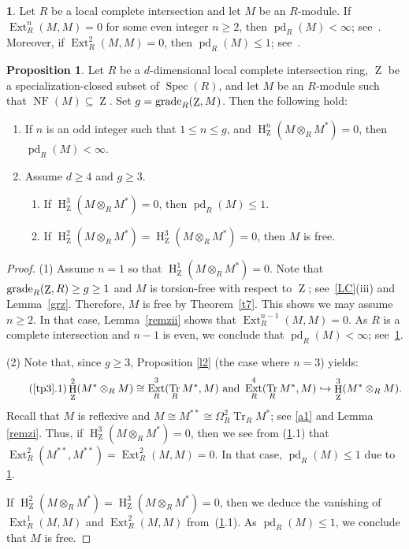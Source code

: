 \documentclass[11pt]{amsart}
\theoremstyle{definition}
\newtheorem{prop}[thm]{Proposition}
\theoremstyle{definition}
\newtheorem{chunk}[thm]{\hspace*{-1.065ex}\bf}
\numberwithin{equation}{section}
\DeclareMathOperator{\gr}{\textnormal{grade}}
\DeclareMathOperator{\Tr}{Tr}
\DeclareMathOperator{\mz}{Z}
\DeclareMathOperator{\Ext}{Ext}
\DeclareMathOperator{\hh}{H}
\DeclareMathOperator{\pd}{pd}
\DeclareMathOperator{\Spec}{Spec}
\DeclareMathOperator{\NF}{NF}
\begin{document}
\begin{chunk} \label{JorJot} Let $R$ be a local complete intersection and let $M$ be an $R$-module. If $\Ext^n_R(M,M)=0$ for some even integer $n\geq 2$, then $\pd_R(M)<\infty$; see~\cite[4.2]{AvBu}. Moreover, if $\Ext^2_R(M,M)=0$, then $\pd_R(M)\leq 1$; see~\cite[2.5]{JorExt}.
\end{chunk}

\begin{prop}\label{tp3} Let $R$ be a $d$-dimensional local complete intersection ring, $\mz$ be a specialization-closed subset of $\Spec(R)$, and let $M$ be an $R$-module such that $\NF(M)\subseteq\mz$. Set $g=\gr_R(\mz,M)$. Then the following hold:
\begin{enumerate}[\rm(1)]
\item If $n$ is an odd integer such that $1\leq n\leq g$, and $\hh^{n}_{\mz}(M\otimes_RM^*)=0$, then $\pd_R(M)<\infty$. 
\item Assume $d\geq 4$ and $g\geq3$. 
\begin{enumerate}[\rm(i)]
\item If $\hh^3_{\mz}(M\otimes_RM^*)=0$, then $\pd_R(M)\leq1$. 
\item If $\hh^2_{\mz}(M\otimes_RM^*)=\hh^3_{\mz}(M\otimes_RM^*)=0$, then $M$ is free.
\end{enumerate}
\end{enumerate}
\end{prop}

\begin{proof} (1) Assume $n=1$ so that $\hh^{1}_{\mz}(M\otimes_RM^*)=0$. Note that $\gr_R(\mz,R)\geq g \geq 1$ and $M$ is torsion-free with respect to $\mz$; see~\ref{LC}(iii) and Lemma~\ref{grz}. Therefore, $M$ is free by Theorem~\ref{t7}. This shows we may assume $n\geq 2$. In that case, Lemma~\ref{remzii} shows that $\Ext^{n-1}_R(M,M)=0$. As $R$ is a complete intersection and $n-1$ is even, we conclude that $\pd_R(M)<\infty$; see~\ref{JorJot}.

(2) Note that, since $g \geq 3$, Proposition \ref{l2} (the case where $n=3$) yields:
\begin{equation}\tag{\ref{tp3}.1}
\hh^{2}_{\mz}(M^{\ast}\otimes_RM)\cong\Ext^{3}_R(\Tr_R M^{\ast}, M) \text{ and } \Ext^{4}_R(\Tr_R M^{\ast}, M)\hookrightarrow\hh^{3}_{\mz}(M^{\ast}\otimes_RM).
\end{equation}
Recall that $M$ is reflexive and $M\cong M^{\ast\ast} \cong \Omega_R^2 \Tr_R M^{\ast}$; see \ref{a1} and Lemma \ref{remzi}.
Thus, if $\hh^3_{\mz}(M\otimes_RM^*)=0$, then we see from (\ref{tp3}.1) that $\Ext^2_R(M^{\ast\ast},M^{\ast\ast})=\Ext^2_R(M,M)=0$. In that case, $\pd_R(M)\leq1$ due to \ref{JorJot}. 

If $\hh^2_{\mz}(M\otimes_RM^*)=\hh^3_{\mz}(M\otimes_RM^*)=0$, then we deduce the vanishing of $\Ext^1_R(M,M)$ and $\Ext^2_R(M,M)$ from~(\ref{tp3}.1).
As $\pd_R(M)\leq1$, we conclude that $M$ is free. 
\end{proof}
\end{document}
